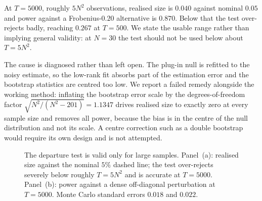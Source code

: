 \documentclass[10pt,twocolumn]{article}
\theoremstyle{remark}
\begin{document}
At $T=5000$, roughly $5N^2$ observations, realised size is $0.040$ against
nominal $0.05$ and power against a Frobenius-$0.20$ alternative is $0.870$.
Below that the test over-rejects badly, reaching $0.267$ at $T=500$. We state
the usable range rather than implying general validity: at $N=30$ the test
should not be used below about $T=5N^2$.

The cause is diagnosed rather than left open. The plug-in null is refitted to
the noisy estimate, so the low-rank fit absorbs part of the estimation error
and the bootstrap statistics are centred too low. We report a failed remedy
alongside the working method: inflating the bootstrap error scale by the
degrees-of-freedom factor $\sqrt{N^2/(N^2-201)}=1.1347$ drives realised size to
exactly zero at every sample size and removes all power, because the bias is in
the centre of the null distribution and not its scale. A centre correction such
as a double bootstrap would require its own design and is not attempted.

\begin{figure}[t]
\centering
{}

\vspace{4pt}

\caption{The departure test is valid only for large samples. Panel~(a): realised
size against the nominal $5\%$ dashed line; the test over-rejects severely
below roughly $T=5N^2$ and is accurate at $T=5000$. Panel~(b): power against a
dense off-diagonal perturbation at $T=5000$. Monte Carlo standard errors
$0.018$ and $0.022$.}
\label{fig:psistudy}
\end{figure}
\end{document}
